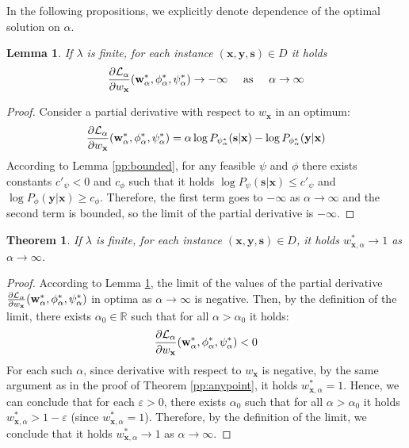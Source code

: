\documentclass[preprint,12pt]{elsarticle}
\newtheorem{theorem}{Theorem}
\newtheorem{lemma}{Lemma}
\begin{document}
In the following propositions, we explicitly denote dependence of the optimal solution on $\alpha$.

\begin{lemma}
	If $\lambda$ is finite, for each instance $(\mathbf{x},\mathbf{y},\mathbf{s})\in D$ it holds
	\begin{equation}
	\frac{\partial{\cal L}_\alpha}{\partial w_\mathbf{x}}(\mathbf{w}^*_\alpha,\phi^*_\alpha,\psi^*_\alpha)\rightarrow -\infty\hspace{5mm}\text{as}\hspace{5mm}\alpha\rightarrow\infty
	\end{equation}
	\label{pp:regularization}
\end{lemma}
\begin{proof}
	Consider a partial derivative with respect to $w_\mathbf{x}$ in an optimum:
	\begin{equation}
	\frac{\partial{\cal L}_\alpha}{\partial w_\mathbf{x}}(\mathbf{w}^*_\alpha,\phi^*_\alpha,\psi^*_\alpha)=\alpha\log P_{\psi^*_\alpha}(\mathbf{s}|\mathbf{x})-\log P_{\phi^*_\alpha}(\mathbf{y}|\mathbf{x})
	\end{equation}
	According to Lemma \ref{pp:bounded}, for any feasible $\psi$ and $\phi$ there exists constants $c'_\psi<0$ and $c_\phi$ such that it holds $\log P_{\psi}(\mathbf{s}|\mathbf{x})\leq c'_\psi$ and $\log P_{\phi}(\mathbf{y}|\mathbf{x})\geq c_\phi$. Therefore, the first term goes to $-\infty$ as $\alpha\rightarrow\infty$ and the second term is bounded, so the limit of the partial derivative is $-\infty$.
\end{proof}

\begin{theorem}
	If $\lambda$ is finite, for each instance $(\mathbf{x},\mathbf{y},\mathbf{s})\in D$, it holds $w_{\mathbf{x},\alpha}^*\rightarrow 1$ as $\alpha\rightarrow\infty$.
	\label{pp:infty}
\end{theorem}
\begin{proof}
	According to Lemma \ref{pp:regularization},
	the limit of the values of the partial derivative $\frac{\partial{\cal L}_\alpha}{\partial w_\mathbf{x}}(\mathbf{w}^*_\alpha,\phi^*_\alpha,\psi^*_\alpha)$ in optima as $\alpha\rightarrow\infty$ is negative. Then, by the definition of the limit, there exists $\alpha_0\in \mathbb{R}$ such that for all $\alpha>\alpha_0$ it holds:
	\begin{equation}
	\frac{\partial{\cal L}_\alpha}{\partial w_\mathbf{x}}(\mathbf{w}^*_\alpha,\phi^*_\alpha,\psi^*_\alpha)<0
	\end{equation}
	For each such $\alpha$, since derivative with respect to $w_\mathbf{x}$ is negative, by the same argument as in the proof of Theorem \ref{pp:anypoint}, it holds $w^*_{\mathbf{x},\alpha}=1$. Hence, we can conclude that for each $\varepsilon>0$, there exists $\alpha_0$ such that for all $\alpha>\alpha_0$ it holds $w^*_{\mathbf{x},\alpha}>1-\varepsilon$  (since $w^*_{\mathbf{x},\alpha}=1$). Therefore, by the definition of the limit, we conclude that it holds $w^*_{\mathbf{x},\alpha}\rightarrow 1$ as $\alpha\rightarrow\infty$.
\end{proof}
\end{document}
